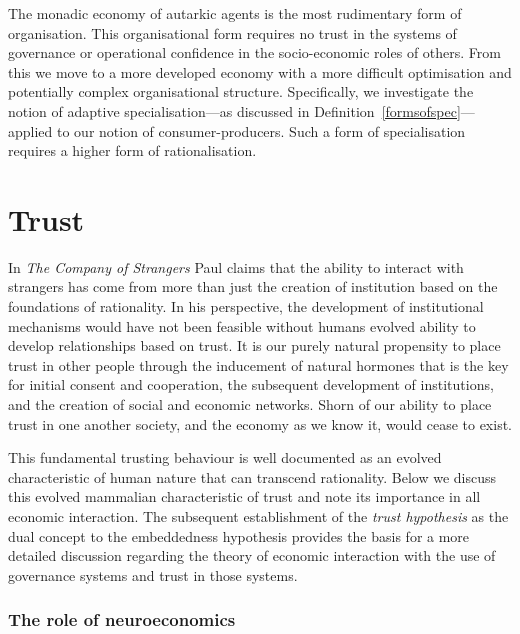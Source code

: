 \begin{subappendices}
The monadic economy of autarkic agents is the most rudimentary form of organisation. This organisational form requires no trust in the systems of governance or operational confidence in the socio-economic roles of others. From this we move to a more developed economy with a more difficult optimisation and potentially complex organisational structure. Specifically, we investigate the notion of adaptive specialisation---as discussed in Definition~\ref{formsofspec}---applied to our notion of consumer-producers. Such a form of specialisation requires a higher form of rationalisation.

\section{Trust}
\label{App:trust}

In \emph{The Company of Strangers} Paul \citet{Seabright2009} claims that the ability to interact with strangers has come from more than just the creation of institution based on the foundations of rationality. In his perspective, the development of institutional mechanisms would have not been feasible without humans evolved ability to develop relationships based on trust. It is our purely natural propensity to place trust in other people through the inducement of natural hormones that is the key for initial consent and cooperation, the subsequent development of institutions, and the creation of social and economic networks. Shorn of our ability to place trust in one another society, and the economy as we know it, would cease to exist.

This fundamental trusting behaviour is well documented as an evolved characteristic of human nature that can transcend rationality. Below we discuss this evolved mammalian characteristic of trust and note its importance in all economic interaction. The subsequent establishment of the \emph{trust hypothesis} as the dual concept to the embeddedness hypothesis provides the basis for a more detailed discussion regarding the theory of economic interaction with the use of governance systems and trust in those systems.

\subsubsection{The role of neuroeconomics}


\end{subappendices}
